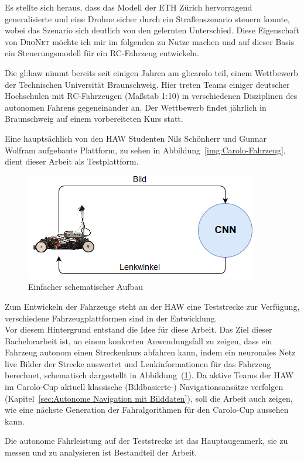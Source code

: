Es stellte sich heraus, dass das Modell der ETH Zürich hervorragend generalisierte und eine Drohne sicher durch ein Straßenszenario steuern konnte, wobei das Szenario sich deutlich von den gelernten Unterschied. Diese Eigenschaft von \textsc{DroNet} möchte ich mir im folgenden zu Nutze machen und auf dieser Basis ein Steuerungsmodell für ein RC-Fahrzeug entwickeln.

Die \gls{gl:haw} nimmt bereits seit einigen Jahren am \glqq \gls{gl:carolo} \grqq{} teil, einem Wettbewerb der Technischen Universität Braunschweig. Hier treten Teams einiger deutscher Hochschulen mit RC-Fahrzeugen (Maßstab 1:10) in verschiedenen Disziplinen des autonomen Fahrens gegeneinander an. Der Wettbewerb findet jährlich in Braunschweig auf einem vorbereiteten Kurs statt.

Eine hauptsächlich von den HAW Studenten Nils Schönherr und Gunnar Wolfram aufgebaute Plattform, zu sehen in Abbildung~\ref{img:Carolo-Fahrzeug}, dient dieser Arbeit als Testplattform.

\begin{figure}[h]
	\centering
	\includegraphics[scale=0.7]{figures/Aufbau.png}
	\caption{Einfacher schematischer Aufbau }
	\label{img:Aufbau}
\end{figure}


Zum Entwickeln der Fahrzeuge steht an der HAW eine Teststrecke zur Verfügung, verschiedene Fahrzeugplattformen sind in der Entwicklung.\\
Vor diesem Hintergrund entstand die Idee für diese Arbeit.
Das Ziel dieser Bachelorarbeit ist, an einem konkreten Anwendungsfall zu zeigen, dass ein Fahrzeug autonom einen Streckenkurs abfahren kann, indem ein neuronales Netz live Bilder der Strecke auswertet und Lenkinformationen für das Fahrzeug berechnet, schematisch dargestellt in Abbildung~(\ref{img:Aufbau}). Da aktive Teams der HAW im Carolo-Cup aktuell klassische (Bildbasierte-) Navigationsansätze verfolgen (Kapitel~\ref{sec:Autonome Navigation mit Bilddaten}), soll die Arbeit auch zeigen, wie eine nächste Generation der Fahralgorithmen für den Carolo-Cup aussehen kann.

Die autonome Fahrleistung auf der Teststrecke ist das Hauptaugenmerk, sie zu messen und zu analysieren ist Bestandteil der Arbeit.



